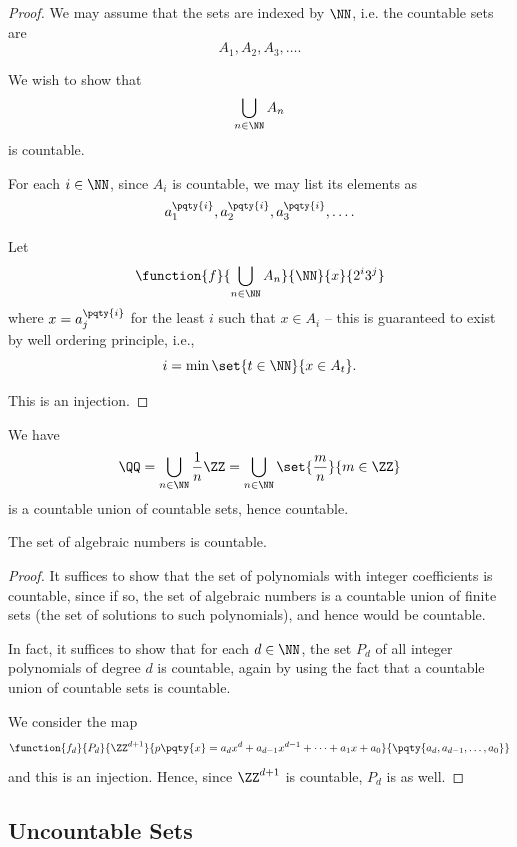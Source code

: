 \begin{proof}
    We may assume that the sets are indexed by \(\NN\), i.e. the countable sets are
    \[
        A_1, A_2, A_3, \ldots.
    \]

    We wish to show that
    \[
        \bigcup_{n \in \NN} A_n
    \]
    is countable.

    For each \(i \in \NN\), since \(A_i\) is countable, we may list its elements as
    \[
        a_1^{\pqty{i}}, a_2^{\pqty{i}}, a_3^{\pqty{i}}, \ldots.
    \]

    Let
    \[
        \function{f}{\bigcup_{n \in \NN} A_n}{\NN}{x}{2^i 3^j}
    \]
    where \(x = a_j^{\pqty{i}}\) for the least \(i\) such that \(x \in A_i\) -- this is guaranteed to exist by well ordering principle, i.e.,
    \[
        i = \min\set{t \in \NN}{x \in A_t}.
    \]

    This is an injection.
\end{proof}

\begin{example}[\(\QQ\) is Countable]
    We have
    \[
        \QQ = \bigcup_{n \in \NN} \frac{1}{n} \ZZ = \bigcup_{n \in \NN} \set{\frac{m}{n}}{m \in \ZZ}
    \]
    is a countable union of countable sets, hence countable.
\end{example}

\begin{theorem}
    The set of algebraic numbers is countable.
\end{theorem}

\begin{proof}
    It suffices to show that the set of polynomials with integer coefficients is countable, since if so, the set of algebraic numbers is a countable union of finite sets (the set of solutions to such polynomials), and hence would be countable.

    In fact, it suffices to show that for each \(d \in \NN\), the set \(P_d\) of all integer polynomials of degree \(d\) is countable, again by using the fact that a countable union of countable sets is countable.

    We consider the map
    \[
        \function{f_d}{P_d}{\ZZ^{d + 1}}{p\pqty{x} = a_d x^d + a_{d - 1} x^{d - 1} + \cdots + a_1 x + a_0}{\pqty{a_d, a_{d - 1}, \ldots, a_0}}
    \]
    and this is an injection. Hence, since \(\ZZ^{d + 1}\) is countable, \(P_d\) is as well.
\end{proof}

\subsection{Uncountable Sets}
\label{sec:uncountable-sets}

